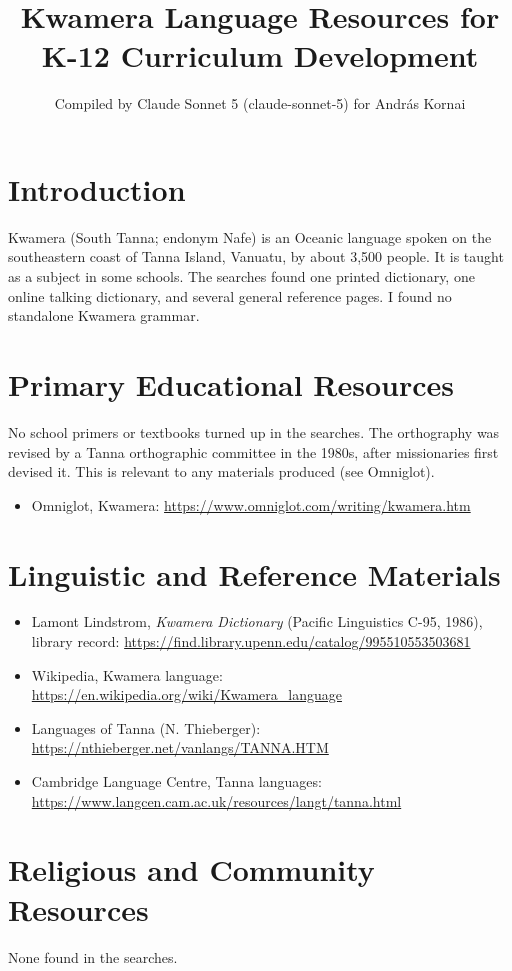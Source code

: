 \documentclass[12pt]{article}
\title{Kwamera Language Resources for K-12 Curriculum Development}
\author{Compiled by Claude Sonnet 5 (claude-sonnet-5) for Andr\'as Kornai}
\date{}
\begin{document}
\maketitle

\section{Introduction}
Kwamera (South Tanna; endonym Nafe) is an Oceanic language spoken on the southeastern coast of Tanna Island, Vanuatu, by about 3,500 people. It is taught as a subject in some schools. The searches found one printed dictionary, one online talking dictionary, and several general reference pages. I found no standalone Kwamera grammar.

\section{Primary Educational Resources}
No school primers or textbooks turned up in the searches. The orthography was revised by a Tanna orthographic committee in the 1980s, after missionaries first devised it. This is relevant to any materials produced (see Omniglot).
\begin{itemize}
\item Omniglot, Kwamera: \url{https://www.omniglot.com/writing/kwamera.htm}
\end{itemize}

\section{Linguistic and Reference Materials}
\begin{itemize}
\item Lamont Lindstrom, \emph{Kwamera Dictionary} (Pacific Linguistics C-95, 1986), library record: \url{https://find.library.upenn.edu/catalog/995510553503681}
\item Wikipedia, Kwamera language: \url{https://en.wikipedia.org/wiki/Kwamera_language}
\item Languages of Tanna (N. Thieberger): \url{https://nthieberger.net/vanlangs/TANNA.HTM}
\item Cambridge Language Centre, Tanna languages: \url{https://www.langcen.cam.ac.uk/resources/langt/tanna.html}
\end{itemize}

\section{Religious and Community Resources}
None found in the searches.
\end{document}
